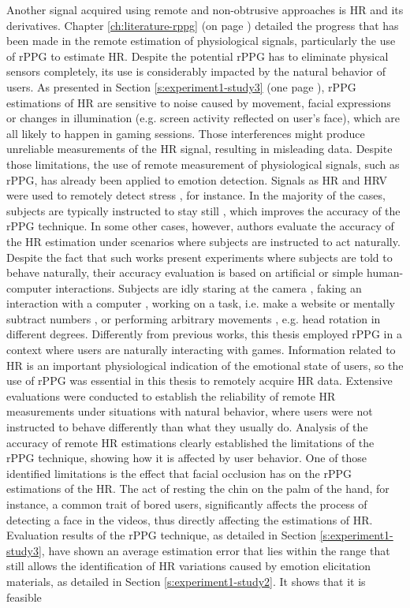 Another signal acquired using remote and non-obtrusive approaches is HR and its derivatives. Chapter \ref{ch:literature-rppg} (on page \pageref{ch:literature-rppg}) detailed the progress that has been made in the remote estimation of physiological signals, particularly the use of rPPG to estimate HR. Despite the potential rPPG has to eliminate physical sensors completely, its use is considerably impacted by the natural behavior of users. As presented in Section \ref{s:experiment1-study3} (one page \pageref{s:experiment1-study3}), rPPG estimations of HR are sensitive to noise caused by movement, facial expressions or changes in illumination (e.g. screen activity reflected on user's face), which are all likely to happen in gaming sessions. Those interferences might produce unreliable measurements of the HR signal, resulting in misleading data. Despite those limitations, the use of remote measurement of physiological signals, such as rPPG, has already been applied to emotion detection. Signals as HR and HRV were used to remotely detect stress \parencite{mcduffcogcam, mcduff2014improvements, bousefsaf2013remote}, for instance. In the majority of the cases, subjects are typically instructed to stay still \parencite{rouast2016remote}, which improves the accuracy of the rPPG technique. In some other cases, however, authors evaluate the accuracy of the HR estimation under scenarios where subjects are instructed to act naturally. Despite the fact that such works present experiments where subjects are told to behave naturally, their accuracy evaluation is based on artificial or simple human-computer interactions. Subjects are idly staring at the camera \parencite{zhao2013remote,hsu2014learning}, faking an interaction with a computer \parencite{poh2010non}, working on a task, i.e. make a website \parencite{monkaresi2014machine} or mentally subtract numbers \parencite{mcduff2014remote}, or performing arbitrary movements \parencite{tran2015robust}, e.g. head rotation in different degrees. Differently from previous works, this thesis employed rPPG in a context where users are naturally interacting with games. Information related to HR is an important physiological indication of the emotional state of users, so the use of rPPG was essential in this thesis to remotely acquire HR data. Extensive evaluations were conducted to establish the reliability of remote HR measurements under situations with natural behavior, where users were not instructed to behave differently than what they usually do. Analysis of the accuracy of remote HR estimations clearly established the limitations of the rPPG technique, showing how it is affected by user behavior. One of those identified limitations is the effect that facial occlusion has on the rPPG estimations of the HR. The act of resting the chin on the palm of the hand, for instance, a common trait of bored users, significantly affects the process of detecting a face in the videos, thus directly affecting the estimations of HR. Evaluation results of the rPPG technique, as detailed in Section \ref{s:experiment1-study3}, have shown an average estimation error that lies within the range that still allows the identification of HR variations caused by emotion elicitation materials, as detailed in Section \ref{s:experiment1-study2}. It shows that it is feasible 
